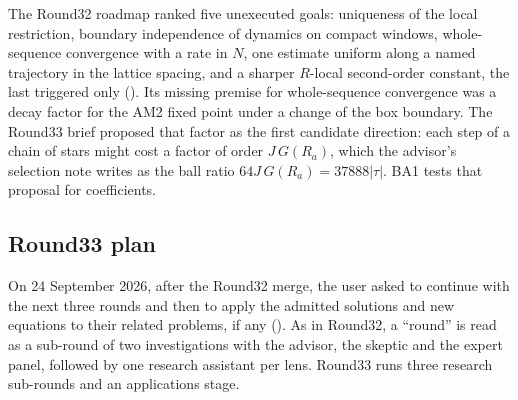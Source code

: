 The Round32 roadmap ranked five unexecuted goals: uniqueness of the local
restriction, boundary independence of dynamics on compact windows,
whole-sequence convergence with a rate in $N$, one estimate uniform along a
named trajectory in the lattice spacing, and a sharper $R$-local second-order
constant, the last triggered only
(). Its
missing premise for whole-sequence convergence was a decay factor for the AM2
fixed point under a change of the box boundary. The Round33 brief proposed
that factor as the first candidate direction: each step of a chain of stars
might cost a factor of order $J\,G(R_a)$, which the advisor's selection note
writes as the ball ratio $64J\,G(R_a)=37888|\tau|$. BA1 tests that proposal
for coefficients.

\subsection{Round33 plan}
\label{sec:plan}

On 24 September 2026, after the Round32 merge, the user asked to continue with
the next three rounds and then to apply the admitted solutions and new
equations to their related problems, if any
(). As in Round32, a ``round''
is read as a sub-round of two investigations with the advisor, the skeptic and
the expert panel, followed by one research assistant per lens. Round33 runs
three research sub-rounds and an applications stage.


